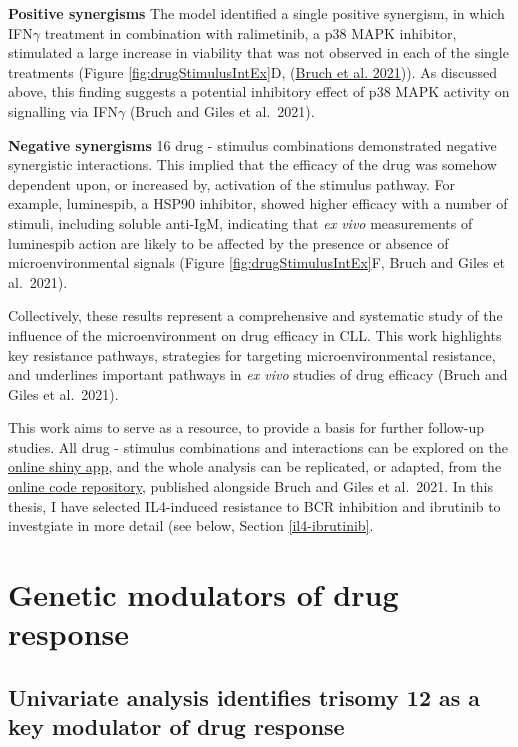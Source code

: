 \documentclass[11pt, a4paper, twosided]{book}
\begin{document}
\textbf{Positive synergisms} The model identified a single positive synergism, in which IFN\(\gamma\) treatment in combination with ralimetinib, a p38 MAPK inhibitor, stimulated a large increase in viability that was not observed in each of the single treatments (Figure \ref{fig:drugStimulusIntEx}D, (\protect\hyperlink{ref-Giles2021}{Bruch et al. 2021})). As discussed above, this finding suggests a potential inhibitory effect of p38 MAPK activity on signalling via IFN\(\gamma\) (Bruch and Giles et al.~2021).

\textbf{Negative synergisms} 16 drug - stimulus combinations demonstrated negative synergistic interactions. This implied that the efficacy of the drug was somehow dependent upon, or increased by, activation of the stimulus pathway. For example, luminespib, a HSP90 inhibitor, showed higher efficacy with a number of stimuli, including soluble anti-IgM, indicating that \emph{ex vivo} measurements of luminespib action are likely to be affected by the presence or absence of microenvironmental signals (Figure \ref{fig:drugStimulusIntEx}F, Bruch and Giles et al.~2021).

Collectively, these results represent a comprehensive and systematic study of the influence of the microenvironment on drug efficacy in CLL. This work highlights key resistance pathways, strategies for targeting microenvironmental resistance, and underlines important pathways in \emph{ex vivo} studies of drug efficacy (Bruch and Giles et al.~2021).

This work aims to serve as a resource, to provide a basis for further follow-up studies. All drug - stimulus combinations and interactions can be explored on the \href{https://www.imbi.uni-heidelberg.de/dietrichlab/CLL_Microenvironment/}{online shiny app}, and the whole analysis can be replicated, or adapted, from the \href{https://github.com/Huber-group-EMBL/CLLCytokineScreen2021}{online code repository}, published alongside Bruch and Giles et al.~2021. In this thesis, I have selected IL4-induced resistance to BCR inhibition and ibrutinib to investgiate in more detail (see below, Section \ref{il4-ibrutinib}.

\hypertarget{mapping-genetic-modulators}{%
\section{Genetic modulators of drug response}\label{mapping-genetic-modulators}}

\hypertarget{univariate-gene-drug-associations}{%
\subsection{Univariate analysis identifies trisomy 12 as a key modulator of drug response}\label{univariate-gene-drug-associations}}
\end{document}
